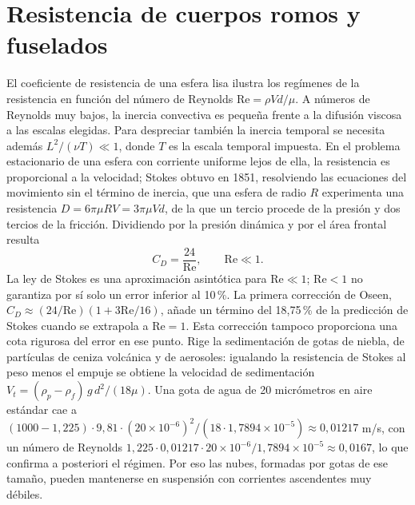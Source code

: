 \documentclass[10pt,openany]{book}
\begin{document}
\section{Resistencia de cuerpos romos y fuselados}

El coeficiente de resistencia de una esfera lisa ilustra los regímenes de la resistencia en función del número de Reynolds \(\mathrm{Re} = \rho V d/\mu\). A números de Reynolds muy bajos, la inercia convectiva es pequeña frente a la difusión viscosa a las escalas elegidas. Para despreciar también la inercia temporal se necesita además \(L^2/(\nu T)\ll1\), donde \(T\) es la escala temporal impuesta. En el problema estacionario de una esfera con corriente uniforme lejos de ella, la resistencia es proporcional a la velocidad; Stokes obtuvo en 1851, resolviendo las ecuaciones del movimiento sin el término de inercia, que una esfera de radio \(R\) experimenta una resistencia \(D = 6\pi\mu R V = 3\pi\mu V d\), de la que un tercio procede de la presión y dos tercios de la fricción. Dividiendo por la presión dinámica y por el área frontal resulta
\begin{equation}
C_D = \frac{24}{\mathrm{Re}}, \qquad \mathrm{Re} \ll 1. \label{eq:c07-stokes}
\end{equation}
La ley de Stokes es una aproximación asintótica para \(\mathrm{Re}\ll 1\); \(\mathrm{Re}<1\) no garantiza por sí solo un error inferior al 10\,\%. La primera corrección de Oseen, \(C_D\approx(24/\mathrm{Re})(1+3\mathrm{Re}/16)\), añade un término del 18{,}75\,\% de la predicción de Stokes cuando se extrapola a \(\mathrm{Re}=1\). Esta corrección tampoco proporciona una cota rigurosa del error en ese punto. Rige la sedimentación de gotas de niebla, de partículas de ceniza volcánica y de aerosoles: igualando la resistencia de Stokes al peso menos el empuje se obtiene la velocidad de sedimentación \(V_t = (\rho_p - \rho_f)\,g\,d^{2}/(18\mu)\). Una gota de agua de 20 micrómetros en aire estándar cae a \((1000 - 1{,}225)\cdot 9{,}81\cdot(20\times 10^{-6})^{2}/(18\cdot 1{,}7894\times 10^{-5}) \approx 0{,}01217\) m/s, con un número de Reynolds \(1{,}225\cdot 0{,}01217\cdot 20\times 10^{-6}/1{,}7894\times 10^{-5} \approx 0{,}0167\), lo que confirma a posteriori el régimen. Por eso las nubes, formadas por gotas de ese tamaño, pueden mantenerse en suspensión con corrientes ascendentes muy débiles.
\end{document}
